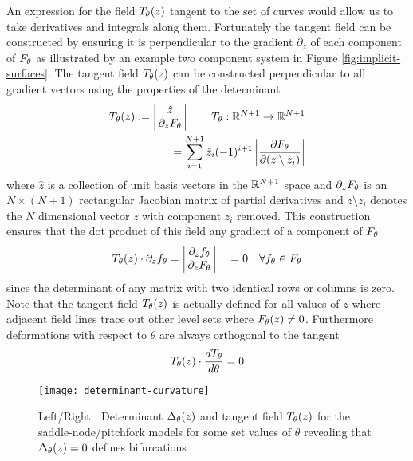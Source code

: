 An expression for the field $T_{\theta}(z)$ tangent to the set of curves would allow us to take derivatives and integrals along them. Fortunately the tangent field can be constructed by ensuring it is perpendicular to the gradient $\partial_z$ of each component of $F_{\theta}$ as illustrated by an example two component system in Figure \ref{fig:implicit-surfaces}. The tangent field $T_{\theta}(z)$ can be constructed perpendicular to all gradient vectors using the properties of the determinant \cite{Goldman2005CurvatureSurfaces}
\begin{align}
    T_{\theta}(z):=
    \label{eq:tangent-field}
    \left|\begin{matrix}
        \hat{z} \\
        \,\partial_{z}F_{\theta}\,
    \end{matrix}\right|
    \qquad T_{\theta} : \mathbb{R}^{N+1}\rightarrow\mathbb{R}^{N+1}\\
    =\sum_{i=1}^{N+1}\hat{z}_{i}(-1)^{i+1} \left|\frac{\partial F_{\theta}}{\partial(z\setminus z_{i}) }\right|
\end{align}
where $\hat{z}$ is a collection of unit basis vectors in the $\mathbb{R}^{N+1}$ space and $\partial_{z}F_{\theta}$ is an $N\times(N+1)$ rectangular Jacobian matrix of partial derivatives and $z\setminus z_{i}$ denotes the $N$ dimensional vector $z$ with component $z_{i}$ removed. This construction ensures that the dot product of this field any gradient of a component of $F_{\theta}$
\begin{align}
    T_{\theta}(z)\cdot\partial_z f_{\theta} =
    \left|\begin{matrix}
        \partial_z f_{\theta} \\
        \,\partial_{z}F_{\theta}\,
    \end{matrix}\right|
    \quad =0 \quad\forall f_{\theta}\in F_{\theta}
\end{align}
since the determinant of any matrix with two identical rows or columns is zero. Note that the tangent field $T_{\theta}(z)$ is actually defined for all values of $z$ where adjacent field lines trace out other level sets where $F_{\theta}(z)\neq0$. Furthermore deformations with respect to $\theta$ are always orthogonal to the tangent
\begin{align}
    T_{\theta}(z)\cdot\frac{dT_{\theta}}{d\theta}=0
\end{align}

\begin{figure}[H]
\centering{}
\captionsetup{justification=centering}
\texttt{[image: determinant-curvature]}
\caption{Left/Right : Determinant $\Delta_{\theta}(z)$ and tangent field $T_{\theta}(z)$ for the saddle-node/pitchfork models for some set values of $\theta$ revealing that $\Delta_{\theta}(z)=0$ defines bifurcations}
\label{fig:determinant-curvature}
\end{figure}

